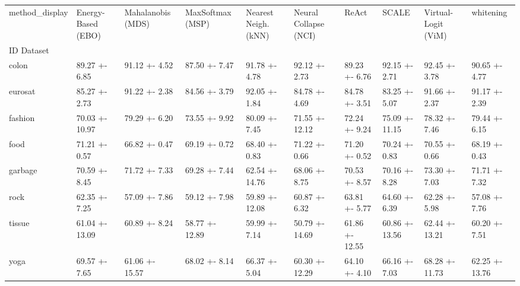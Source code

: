 \begin{tabular}{llllllllll}
\toprule
method_display & Energy-Based (EBO) & Mahalanobis (MDS) & MaxSoftmax (MSP) & Nearest Neigh. (kNN) & Neural Collapse (NCI) & ReAct & SCALE & Virtual-Logit (ViM) & whitening \\
ID Dataset &  &  &  &  &  &  &  &  &  \\
\midrule
colon & 89.27 +- 6.85 & 91.12 +- 4.52 & 87.50 +- 7.47 & 91.78 +- 4.78 & 92.12 +- 2.73 & 89.23 +- 6.76 & 92.15 +- 2.71 & 92.45 +- 3.78 & 90.65 +- 4.77 \\
eurosat & 85.27 +- 2.73 & 91.22 +- 2.38 & 84.56 +- 3.79 & 92.05 +- 1.84 & 84.78 +- 4.69 & 84.78 +- 3.51 & 83.25 +- 5.07 & 91.66 +- 2.37 & 91.17 +- 2.39 \\
fashion & 70.03 +- 10.97 & 79.29 +- 6.20 & 73.55 +- 9.92 & 80.09 +- 7.45 & 71.55 +- 12.12 & 72.24 +- 9.24 & 75.09 +- 11.15 & 78.32 +- 7.46 & 79.44 +- 6.15 \\
food & 71.21 +- 0.57 & 66.82 +- 0.47 & 69.19 +- 0.72 & 68.40 +- 0.83 & 71.22 +- 0.66 & 71.20 +- 0.52 & 70.24 +- 0.83 & 70.55 +- 0.66 & 68.19 +- 0.43 \\
garbage & 70.59 +- 8.45 & 71.72 +- 7.33 & 69.28 +- 7.44 & 62.54 +- 14.76 & 68.06 +- 8.75 & 70.53 +- 8.57 & 70.16 +- 8.28 & 73.30 +- 7.03 & 71.71 +- 7.32 \\
rock & 62.35 +- 7.25 & 57.09 +- 7.86 & 59.12 +- 7.98 & 59.89 +- 12.08 & 60.87 +- 6.32 & 63.81 +- 5.77 & 64.60 +- 6.39 & 62.28 +- 5.98 & 57.08 +- 7.76 \\
tissue & 61.04 +- 13.09 & 60.89 +- 8.24 & 58.77 +- 12.89 & 59.99 +- 7.14 & 50.79 +- 14.69 & 61.86 +- 12.55 & 60.86 +- 13.56 & 62.44 +- 13.21 & 60.20 +- 7.51 \\
yoga & 69.57 +- 7.65 & 61.06 +- 15.57 & 68.02 +- 8.14 & 66.37 +- 5.04 & 60.30 +- 12.29 & 64.10 +- 4.10 & 66.16 +- 7.03 & 68.28 +- 11.73 & 62.25 +- 13.76 \\
\bottomrule
\end{tabular}
